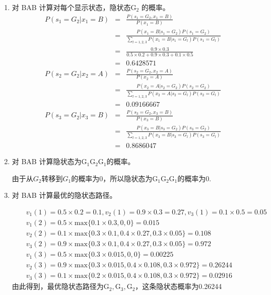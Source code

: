 \documentclass{ctexart}
\begin{document}
\begin{enumerate}
\begin{enumerate}
\item 对 BAB 计算对每个显示状态，隐状态\(\mbox{G}_2\) 的概率。
\begin{eqnarray*}
 P(s_1=G_2|x_1=B)&=&\frac{P(s_1=G_2,x_1=B)}{P(x_1=B)}\\
 &=&\frac{P(x_1=B|s_1=G_2)P(s_1=G_2)}{\sum_{l=1,2,3}P(x_1=B|s_1=G_l)P(s_1=G_l)} \\
 &=& \frac{0.9\times0.3}{0.5\times0.2+0.9\times0.3+0.1\times0.5}\\
 &=&0.6428571
 \end{eqnarray*}
 \begin{eqnarray*}
 P(s_2=G_2|x_2=A)&=&\frac{P(s_2=G_2,x_2=A)}{P(x_2=A)}\\
 &=& \frac{P(x_2=A|s_2=G_2)P(s_2=G_2)}{\sum_{l=1,2,3}P(x_2=A|s_2=G_l)P(s_2=G_l)} \\
 &=&0.09166667
 \end{eqnarray*}
 \begin{eqnarray*}
 P(s_3=G_2|x_3=B)&=&\frac{P(s_3=G_2,x_3=B)}{P(x_3=B)}\\
 &=& \frac{P(x_3=B|s_3=G_2)P(s_3=G_2)}{\sum_{l=1,2,3}P(x_3=B|s_3=G_l)P(s_3=G_l)} \\
 &=&0.8686047
 \end{eqnarray*}
 
\item 对 BAB 计算隐状态为\(\mbox{G}_1\mbox{G}_2\mbox{G}_1\)的概率。

由于从\(G_2\)转移到\(G_1\)的概率为0，所以隐状态为\(\mbox{G}_1\mbox{G}_2\mbox{G}_1\)的概率为0.

\item 对 BAB 计算最优的隐状态路径。

\begin{eqnarray*}
& &v_1(1)=0.5\times0.2=0.1,v_2(1)=0.9\times0.3=0.27,v_3(1)=0.1\times0.5=0.05\\
& &v_1(2)=0.5\times \mbox{max}\{0.1\times0.3,0,0\}=0.015\\
& &v_2(2)=0.1\times \mbox{max}\{0.3\times0.1, 0.4\times0.27,0.3\times0.05\}=0.108\\
& &v_3(2)=0.9\times \mbox{max} \{0.3\times0.1,0.4\times0.27,0.3\times0.05 \}=0.972\\
& &v_1(3)=0.5\times \mbox{max} \{0.3\times0.015,0,0 \}=0.00225\\
& &v_2(3)=0.9\times \mbox{max}\{ 0.3\times0.015,0.4\times0.108, 0.3\times0.972\}=0.26244\\
& &v_3(3)=0.1\times \mbox{max} \{0.2\times0.015,0.4\times0.108,0.3\times0.972 \}=0.02916
\end{eqnarray*}
由此得到，最优隐状态路径为\(\mbox{G}_2,\mbox{G}_3,\mbox{G}_2\)，这条隐状态概率为0.26244
\end{enumerate}


\end{enumerate}
\end{document}
